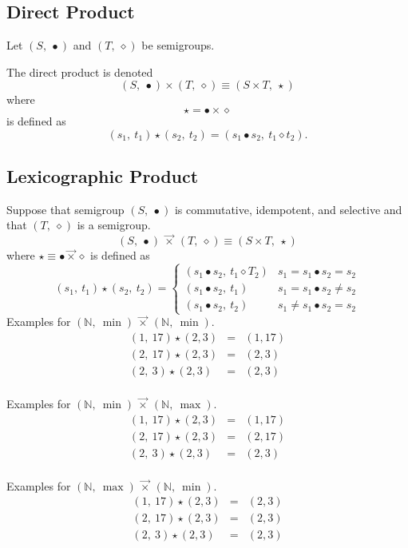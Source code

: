 \documentclass[10pt]{article}
\newcommand{\NN}{\mathbb{N}}
\newcommand{\lexprod}{\ensuremath{\mathbin{\vec{\times}}}}
\begin{document}
\subsection{Direct Product} 

Let $(S,\ \bullet)$ and $(T,\ \diamond)$ be semigroups.

The {direct product} is denoted 
\[ 
   (S,\ \bullet) \times (T,\ \diamond) \equiv (S \times T,\ \star)
\] 
where 
\[ 
\star = \bullet \times \diamond 
\] 
is defined as 
\[ 
	(s_1,\ t_1) \star (s_2,\ t_2) 
        = 
        (s_1 \bullet s_2,\  t_1 \diamond t_2).
\] 


\subsection{Lexicographic Product} 

Suppose that semigroup $(S,\ \bullet)$ is commutative, idempotent, and selective 
and that $(T,\ \diamond)$ is a semigroup. 
\[
(S,\ \bullet)\ \lexprod\ (T,\ \diamond) \equiv (S \times T,\ \star)
\]
where $\star \equiv \bullet\lexprod\diamond$ is defined as 
\[
  (s_1,\ t_1) \star (s_2,\ t_2) =
        \begin{cases}
          (s_1 \bullet s_2,\ t_1 \diamond T_2)   & s_1 = s_1 \bullet s_2 = s_2 \\
          (s_1 \bullet s_2,\ t_1)                & s_1 = s_1 \bullet s_2 \neq s_2 \\
          (s_1 \bullet s_2,\ t_2)                & s_1 \neq s_1 \bullet s_2 = s_2 
        \end{cases}
\]
Examples for $(\NN,\ \min)\ \lexprod\ (\NN,\ \min)$. 
\[
\begin{array}{rcl}
(1,\ 17) \star (2, 3) & = & (1, 17) \\ 
(2,\ 17) \star (2, 3) & = & (2, 3) \\ 
(2,\ 3)  \star (2, 3) & = & (2, 3) \\ 
\end{array} 
\] 

Examples for $(\NN,\ \min)\ \lexprod\ (\NN,\ \max)$. 
\[
\begin{array}{rcl}
(1,\ 17) \star (2, 3) & = & (1, 17) \\ 
(2,\ 17) \star (2, 3) & = & (2, 17) \\ 
(2,\ 3)  \star (2, 3) & = & (2, 3) \\ 
\end{array} 
\] 

Examples for $(\NN,\ \max)\ \lexprod\ (\NN,\ \min)$. 
\[
\begin{array}{rcl}
(1,\ 17) \star (2, 3) & = & (2, 3) \\ 
(2,\ 17) \star (2, 3) & = & (2, 3) \\ 
(2,\ 3)  \star (2, 3) & = & (2, 3) \\ 
\end{array} 
\] 
\end{document}
